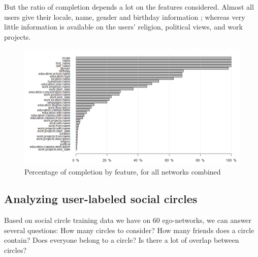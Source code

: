 \documentclass[11pt]{article}       %
\begin{document}
\newpage
But the ratio of completion depends a lot on the features considered. Almost all users give their locale, name, gender and birthday information ; whereas very little information is available on the users' religion, political views, and work projects.


\begin{figure}[H]
\centering
  \includegraphics[width=\linewidth]{featurecompletion.png}
    \caption{Percentage of completion by feature, for all networks combined}
\end{figure}

\subsection{Analyzing user-labeled social circles} \label{socialcirclelabels}
Based on social circle training data we have on 60 ego-networks, we can answer several questions: How many circles to consider? How many friends does a circle contain? Does everyone belong to a circle? Is there a lot of overlap between circles?
\end{document}
